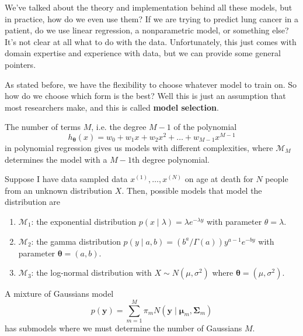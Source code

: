 \documentclass{article}
\begin{document}
    We've talked about the theory and implementation behind all these models, but in practice, how do we even use them? If we are trying to predict lung cancer in a patient, do we use linear regression, a nonparametric model, or something else? It's not clear at all what to do with the data. Unfortunately, this just comes with domain expertise and experience with data, but we can provide some general pointers. 

    As stated before, we have the flexibility to choose whatever model to train on. So how do we choose which form is the best? Well this is just an assumption that most researchers make, and this is called \textbf{model selection}. 

    \begin{example}
      The number of terms $M$, i.e. the degree $M-1$ of the polynomial 
        \[h_{\boldsymbol{\theta}} (x) = w_0 + w_1 x + w_2 x^2 + \ldots + w_{M-1} x^{M-1}\]
      in polynomial regression gives us models with different complexities, where $\mathcal{M}_M$ determines the model with a $M-1$th degree polynomial. 
    \end{example}

    \begin{example}
      Suppose I have data sampled data $x^{(1)}, \ldots, x^{(N)}$ on age at death for $N$ people from an unknown distribution $X$. Then, possible models that model the distribution are 

      \begin{enumerate}
        \item $\mathcal{M}_1$: the exponential distribution $p(x \mid \lambda) = \lambda e^{-\lambda y}$ with parameter $\theta = \lambda$. 
        \item $\mathcal{M}_2$: the gamma distribution $p(y \mid a, b) = (b^a / \Gamma(a)) y^{a - 1} e^{- by}$ with parameter $\boldsymbol{\theta} = (a, b)$. 
        \item $\mathcal{M}_3$: the log-normal distribution with $X \sim N (\mu, \sigma^2)$ where ${\boldsymbol{\theta}} = (\mu, \sigma^2)$. 
      \end{enumerate}
    \end{example}

    \begin{example}
      A mixture of Gaussians model 
        \[p(\mathbf{y}) = \sum_{m=1}^M \pi_m N(\mathbf{y} \mid \boldsymbol{\mu}_m, \boldsymbol{\Sigma}_m )\]
      has submodels where we must determine the number of Gaussians $M$. 
    \end{example}
\end{document}
